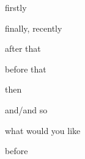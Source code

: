 \begin{flashcard}{\LARGE firstly}
\LARGE {}
\end{flashcard}
\begin{flashcard}{\LARGE finally, recently}
\LARGE {}
\end{flashcard}
\begin{flashcard}{\LARGE after that}
\LARGE {}
\end{flashcard}
\begin{flashcard}{\LARGE before that}
\LARGE {}
\end{flashcard}
\begin{flashcard}{\LARGE then}
\LARGE {}
\end{flashcard}
\begin{flashcard}{\LARGE and/and so}
\LARGE {}
\end{flashcard}
\begin{flashcard}{\LARGE what would you like}
\LARGE {}
\end{flashcard}
\begin{flashcard}{\LARGE before}
\LARGE {}
\end{flashcard}

